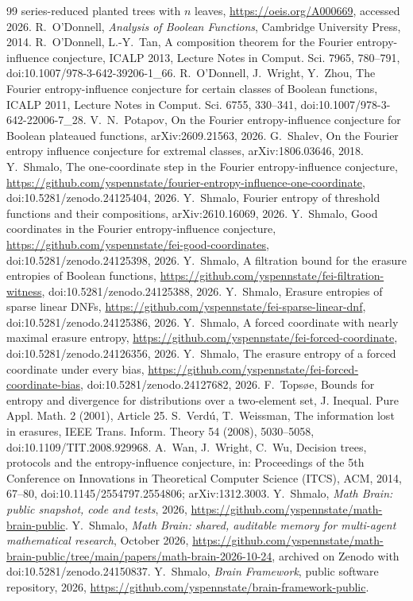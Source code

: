 \documentclass[11pt]{amsart}
\theoremstyle{remark}
\begin{document}
\begin{thebibliography}{99}
series-reduced planted trees with $n$ leaves, \url{https://oeis.org/A000669}, accessed 2026.
 R.~O'Donnell, \emph{Analysis of Boolean Functions}, Cambridge University Press, 2014.
 R.~O'Donnell, L.-Y.~Tan, A composition theorem for the Fourier entropy-influence conjecture, ICALP 2013,
Lecture Notes in Comput. Sci. 7965, 780--791, doi:10.1007/978-3-642-39206-1\_66.
 R.~O'Donnell, J.~Wright, Y.~Zhou, The Fourier entropy-influence conjecture for certain classes of
Boolean functions, ICALP 2011, Lecture Notes in Comput. Sci. 6755, 330--341, doi:10.1007/978-3-642-22006-7\_28.
 V.~N.~Potapov, On the Fourier entropy-influence conjecture for Boolean plateaued functions,
arXiv:2609.21563, 2026.
 G.~Shalev, On the Fourier entropy influence conjecture for extremal classes, arXiv:1806.03646, 2018.
 Y.~Shmalo, The one-coordinate step in the Fourier entropy-influence conjecture,
\url{https://github.com/yspennstate/fourier-entropy-influence-one-coordinate}, doi:10.5281/zenodo.24125404, 2026.
 Y.~Shmalo, Fourier entropy of threshold functions and their compositions, arXiv:2610.16069, 2026.
 Y.~Shmalo, Good coordinates in the Fourier entropy-influence conjecture,
\url{https://github.com/yspennstate/fei-good-coordinates}, doi:10.5281/zenodo.24125398, 2026.
 Y.~Shmalo, A filtration bound for the erasure entropies of Boolean functions,
\url{https://github.com/yspennstate/fei-filtration-witness}, doi:10.5281/zenodo.24125388, 2026.
 Y.~Shmalo, Erasure entropies of sparse linear DNFs,
\url{https://github.com/yspennstate/fei-sparse-linear-dnf}, doi:10.5281/zenodo.24125386, 2026.
 Y.~Shmalo, A forced coordinate with nearly maximal erasure entropy,
\url{https://github.com/yspennstate/fei-forced-coordinate}, doi:10.5281/zenodo.24126356, 2026.
 Y.~Shmalo, The erasure entropy of a forced coordinate under every bias,
\url{https://github.com/yspennstate/fei-forced-coordinate-bias}, doi:10.5281/zenodo.24127682, 2026.
 F.~Tops{\o}e, Bounds for entropy and divergence for distributions over a two-element set, J. Inequal.
Pure Appl. Math. 2 (2001), Article 25.
 S.~Verd\'u, T.~Weissman, The information lost in erasures, IEEE Trans. Inform. Theory 54 (2008),
5030--5058, doi:10.1109/TIT.2008.929968.
A.~Wan, J.~Wright, C.~Wu, Decision trees, protocols and the entropy-influence conjecture, in: Proceedings of the 5th
Conference on Innovations in Theoretical Computer Science (ITCS), ACM, 2014, 67--80, doi:10.1145/2554797.2554806;
arXiv:1312.3003.
 Y.~Shmalo, \emph{Math Brain: public snapshot, code and tests}, 2026,
\url{https://github.com/yspennstate/math-brain-public}.
 Y.~Shmalo, \emph{Math Brain: shared, auditable memory for multi-agent mathematical research},
October 2026, \url{https://github.com/yspennstate/math-brain-public/tree/main/papers/math-brain-2026-10-24}, archived on Zenodo with doi:10.5281/zenodo.24150837.
 Y.~Shmalo, \emph{Brain Framework}, public software repository, 2026,
\url{https://github.com/yspennstate/brain-framework-public}.
\end{thebibliography}
\end{document}
